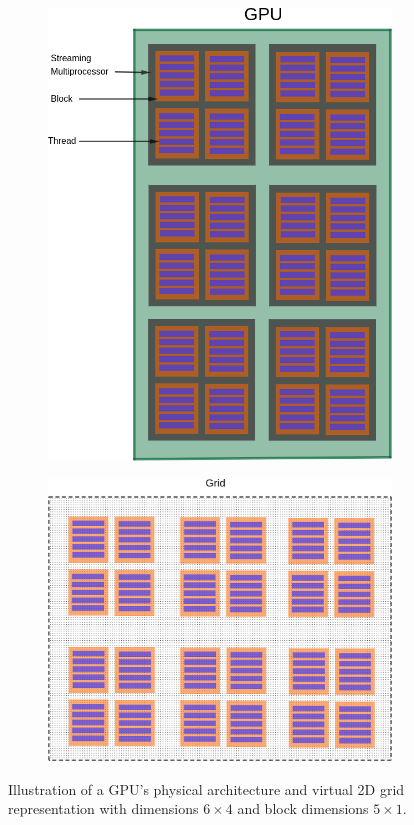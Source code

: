 \begin{figure}
	\centering
	\begin{subfigure}{0.35\linewidth}
		\centering
		\includegraphics[width=\linewidth]{Figures/gpu_arch}
	\end{subfigure} \hfill
	\begin{subfigure}{0.55\linewidth}
		\centering
		\includegraphics[width=0.9\linewidth]{Figures/gpu_grid}
	\end{subfigure}
	\caption{Illustration of a GPU's physical architecture and virtual 2D grid representation with dimensions $6\times4$ and block dimensions $5\times1$.}
	\label{fig:gpu_arch}
\end{figure}
